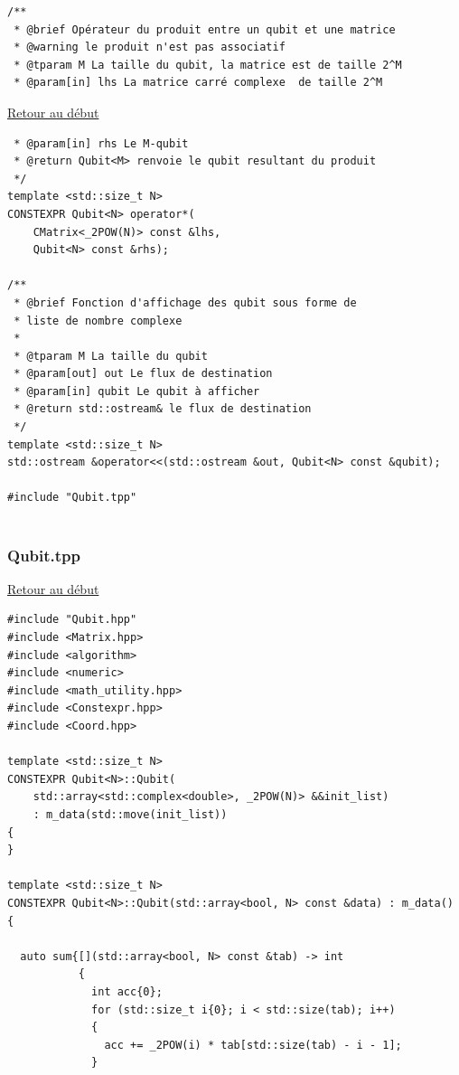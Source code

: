 {\begin{frame}[fragile]
\begin{verbatim}
/**
 * @brief Opérateur du produit entre un qubit et une matrice
 * @warning le produit n'est pas associatif
 * @tparam M La taille du qubit, la matrice est de taille 2^M
 * @param[in] lhs La matrice carré complexe  de taille 2^M
\end{verbatim}
\end{frame}

\begin{frame}[fragile]
\hyperlink{conclusion}{Retour au début}\newline
\begin{verbatim}
 * @param[in] rhs Le M-qubit
 * @return Qubit<M> renvoie le qubit resultant du produit
 */
template <std::size_t N>
CONSTEXPR Qubit<N> operator*(
    CMatrix<_2POW(N)> const &lhs,
    Qubit<N> const &rhs);

/**
 * @brief Fonction d'affichage des qubit sous forme de
 * liste de nombre complexe
 *
 * @tparam M La taille du qubit
 * @param[out] out Le flux de destination
 * @param[in] qubit Le qubit à afficher
 * @return std::ostream& le flux de destination
 */
template <std::size_t N>
std::ostream &operator<<(std::ostream &out, Qubit<N> const &qubit);

#include "Qubit.tpp"


\end{verbatim}
\end{frame}

\begin{frame}[fragile]
\label{Qubit.tpp}
\frametitle{Qubit.tpp}
\hyperlink{conclusion}{Retour au début}\newline
\begin{verbatim}
#include "Qubit.hpp"
#include <Matrix.hpp>
#include <algorithm>
#include <numeric>
#include <math_utility.hpp>
#include <Constexpr.hpp>
#include <Coord.hpp>

template <std::size_t N>
CONSTEXPR Qubit<N>::Qubit(
    std::array<std::complex<double>, _2POW(N)> &&init_list)
    : m_data(std::move(init_list))
{
}

template <std::size_t N>
CONSTEXPR Qubit<N>::Qubit(std::array<bool, N> const &data) : m_data()
{

  auto sum{[](std::array<bool, N> const &tab) -> int
           {
             int acc{0};
             for (std::size_t i{0}; i < std::size(tab); i++)
             {
               acc += _2POW(i) * tab[std::size(tab) - i - 1];
             }
\end{verbatim}
\end{frame}

}
